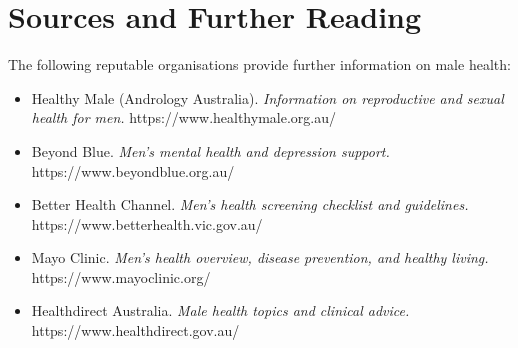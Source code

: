 \section*{Sources and Further Reading}
The following reputable organisations provide further information on male health:
\begin{itemize}
    \item Healthy Male (Andrology Australia). \textit{Information on reproductive and sexual health for men.} https://www.healthymale.org.au/
    \item Beyond Blue. \textit{Men's mental health and depression support.} https://www.beyondblue.org.au/
    \item Better Health Channel. \textit{Men's health screening checklist and guidelines.} https://www.betterhealth.vic.gov.au/
    \item Mayo Clinic. \textit{Men's health overview, disease prevention, and healthy living.} https://www.mayoclinic.org/
    \item Healthdirect Australia. \textit{Male health topics and clinical advice.} https://www.healthdirect.gov.au/
\end{itemize}
